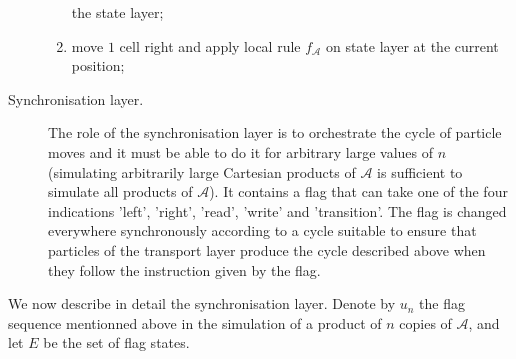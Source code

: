 \documentclass[a4paper]{elsarticle}
\newcommand{\ACA}{\mathcal{A}}
\newcommand{\locA}{f_{\ACA}}
\newcommand\flagseq[1]{u_{#1}}
\begin{document}
\begin{description}
\begin{enumerate}
    the state layer;
  \item move $1$ cell right and apply local rule $\locA$ on state
    layer at the current position;
  \end{enumerate}
\item[Synchronisation layer.] The role of the synchronisation layer is
  to orchestrate the cycle of particle moves and it must be able to do
  it for arbitrary large values of $n$ (simulating arbitrarily large
  Cartesian products of $\ACA$ is sufficient to simulate all products
  of $\ACA$). It contains a flag that can take one of the four
  indications 'left', 'right', 'read', 'write' and 'transition'. The
  flag is changed everywhere synchronously according to a cycle
  suitable to ensure that particles of the transport layer produce the
  cycle described above when they follow the instruction given by the
  flag.
\end{description}

We now describe in detail the synchronisation layer.  Denote by
$\flagseq{n}$ the flag sequence mentionned above in the simulation of
a product of $n$ copies of $\ACA$, and let $E$ be the set of flag
states.
\end{document}
